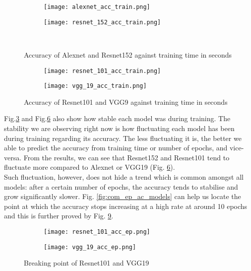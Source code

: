 \begin{figure}[h]
     \begin{subfigure}{0.5\textwidth}
	    \texttt{[image: alexnet\_acc\_train.png]}
         \label{fig:alexnet_acc_train}
     \end{subfigure}
     \hfill
     \begin{subfigure}{0.5\textwidth}
	    \texttt{[image: resnet\_152\_acc\_train.png]}
        \label{fig:resnet_152_acc_train}
     \end{subfigure}\\
     \caption{Accuracy of Alexnet and Resnet152 against training time in seconds}
        \label{fig:sing_acc_train2}
\end{figure}
\begin{figure}[h]
     \begin{subfigure}{0.5\textwidth}
	    \texttt{[image: resnet\_101\_acc\_train.png]}
        \label{fig:resnet_1o1_acc_train}
     \end{subfigure}
     \begin{subfigure}{0.5\textwidth}
	    \texttt{[image: vgg\_19\_acc\_train.png]}
        \label{fig:vgg_19_acc_train}
     \end{subfigure}
        \caption{Accuracy of Resnet101 and VGG9 against training time in seconds}
        \label{fig:sing_acc_train}
\end{figure}
Fig.\ref{fig:sing_acc_train2} and Fig.\ref{fig:sing_acc_train} also show how stable each model was during training. The stability we are observing right now is how fluctuating each model has been during training regarding its accuracy. The less fluctuating it is, the better we able to predict the accuracy from training time or number of epochs, and vice-versa. From the results, we can see that Resnet152 and Resnet101 tend to fluctuate more compared to Alexnet or VGG19 (Fig. \ref{fig:sing_acc_train}). \\
Such fluctuation, however, does not hide a trend which is common amongst all models: after a certain number of epochs, the accuracy tends to stabilise and grow significantly slower. Fig. \ref{fig:com_ep_ac_models} can help us locate the point at which the accuracy stops increasing at a high rate at around 10 epochs and this is further proved by Fig. \ref{fig:sing_acc_ep}.\\
\begin{figure}[h]
     \begin{subfigure}{0.5\textwidth}
	    \texttt{[image: resnet\_101\_acc\_ep.png]}
        \label{fig:resnet_101_acc_ep}
     \end{subfigure}
     \begin{subfigure}{0.5\textwidth}
	    \texttt{[image: vgg\_19\_acc\_ep.png]}
        \label{fig:vgg_19_acc_ep}
     \end{subfigure}
        \caption{Breaking point of Resnet101 and VGG19}
        \label{fig:sing_acc_ep}
\end{figure}\\



